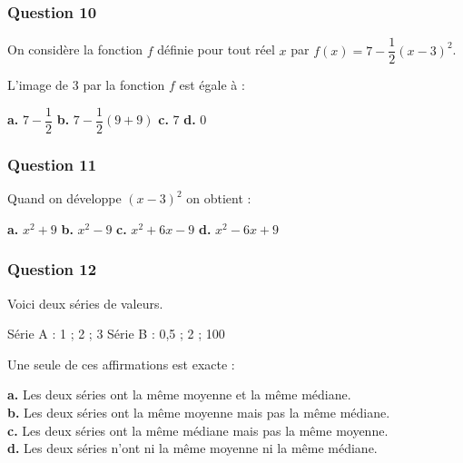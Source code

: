 \subsubsection*{Question 10}
On considère la fonction $f$ définie pour tout réel $x$ par $f(x) = 7 - \dfrac{1}{2}(x - 3)^2$.

L'image de 3 par la fonction $f$ est égale à :

\textbf{a.} $7 - \dfrac{1}{2}$ \hfill \textbf{b.} $7 - \dfrac{1}{2}(9 + 9)$ \hfill 
\textbf{c.} $7$ \hfill \textbf{d.} $0$

\subsubsection*{Question 11}
Quand on développe $(x - 3)^2$ on obtient :

\textbf{a.} $x^2 + 9$ \hfill \textbf{b.} $x^2 - 9$ \hfill 
\textbf{c.} $x^2 + 6x - 9$ \hfill \textbf{d.} $x^2 - 6x + 9$

\subsubsection*{Question 12}
Voici deux séries de valeurs.

Série A : 1 ; 2 ; 3 \hfill Série B : 0,5 ; 2 ; 100

Une seule de ces affirmations est exacte :

\textbf{a.} Les deux séries ont la même moyenne et la même médiane. \\
\textbf{b.} Les deux séries ont la même moyenne mais pas la même médiane. \\
\textbf{c.} Les deux séries ont la même médiane mais pas la même moyenne. \\
\textbf{d.} Les deux séries n'ont ni la même moyenne ni la même médiane.
